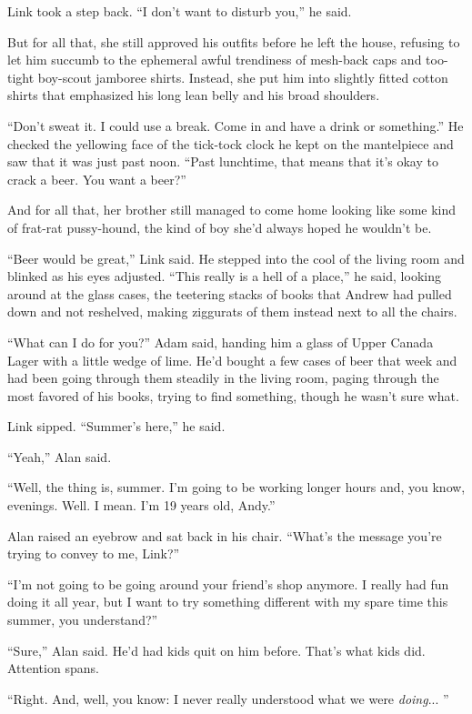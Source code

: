 \documentclass{article}
\begin{document}
Link took a step back.  ``I don't want to disturb you,'' he said.

But for all that, she still approved his outfits before he left the
house, refusing to let him succumb to the ephemeral awful trendiness
of mesh-back caps and too-tight boy-scout jamboree shirts.  Instead,
she put him into slightly fitted cotton shirts that emphasized his
long lean belly and his broad shoulders.

``Don't sweat it.  I could use a break.  Come in and have a drink or
something.'' He checked the yellowing face of the tick-tock clock he
kept on the mantelpiece and saw that it was just past noon.  ``Past
lunchtime, that means that it's okay to crack a beer.  You want a
beer?''

And for all that, her brother still managed to come home looking like
some kind of frat-rat pussy-hound, the kind of boy she'd always hoped
he wouldn't be.

``Beer would be great,'' Link said.  He stepped into the cool of the
living room and blinked as his eyes adjusted.  ``This really is a hell
of a place,'' he said, looking around at the glass cases, the
teetering stacks of books that Andrew had pulled down and not
reshelved, making ziggurats of them instead next to all the chairs.

``What can I do for you?'' Adam said, handing him a glass of Upper
Canada Lager with a little wedge of lime.  He'd bought a few cases of
beer that week and had been going through them steadily in the living
room, paging through the most favored of his books, trying to find
something, though he wasn't sure what.

Link sipped.  ``Summer's here,'' he said.

``Yeah,'' Alan said.

``Well, the thing is, summer.  I'm going to be working longer hours
and, you know, evenings.  Well.  I mean.  I'm 19 years old, Andy.''

Alan raised an eyebrow and sat back in his chair.  ``What's the
message you're trying to convey to me, Link?''

``I'm not going to be going around your friend's shop anymore.  I
really had fun doing it all year, but I want to try something
different with my spare time this summer, you understand?''

``Sure,'' Alan said.  He'd had kids quit on him before.  That's what
kids did.  Attention spans.

``Right.  And, well, you know:  I never really understood what we were
\textit{doing}...  ''
\end{document}
